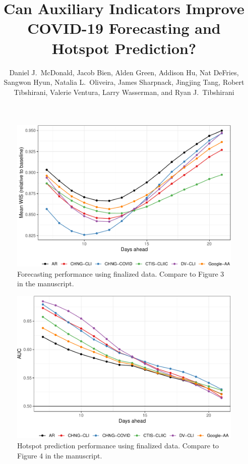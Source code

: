 \documentclass[9pt,twoside,lineno]{pnas-new}
\title{Can Auxiliary Indicators Improve COVID-19 Forecasting and Hotspot  
  Prediction?}
\author{Daniel J.\ McDonald, Jacob Bien, Alden Green, Addison Hu, Nat DeFries, Sangwon Hyun, Natalia L.\ Oliveira, James Sharpnack, Jingjing Tang, Robert Tibshirani, Valerie Ventura, Larry Wasserman, and Ryan J.\ Tibshirani}
\begin{document}
\maketitle


\SItext





\begin{figure}

{\centering \includegraphics[width=\textwidth]{fig/fcast-finalized-1} 

}

\caption{Forecasting performance using finalized data. Compare to Figure 3 in the manuscript.}\label{fig:fcast-finalized}
\end{figure}

\clearpage

\begin{figure}

{\centering \includegraphics[width=\textwidth]{fig/hot-finalized-1} 

}

\caption{Hotspot prediction performance using finalized data. Compare to Figure 4 in the manuscript.}\label{fig:hot-finalized}
\end{figure}
\end{document}
